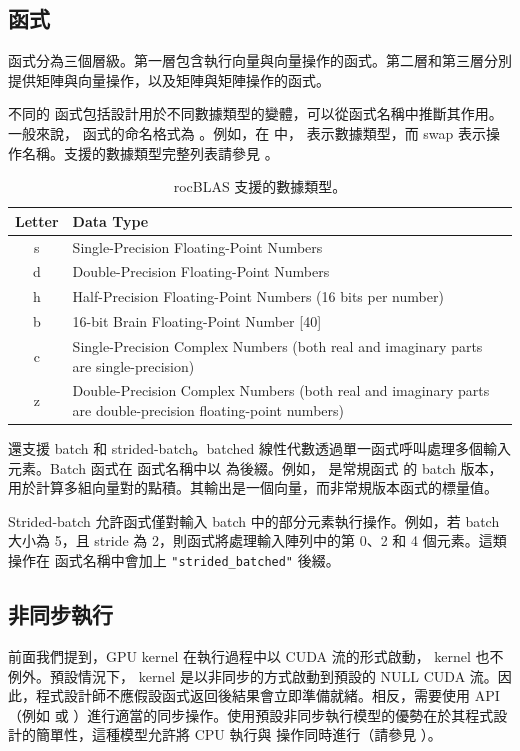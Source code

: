 \subsection{ 函式} \label{sec:rocBLAS_function}
 函式分為三個層級。第一層包含執行向量與向量操作的函式。第二層和第三層分別提供矩陣與向量操作，以及矩陣與矩陣操作的函式。

不同的  函式包括設計用於不同數據類型的變體，可以從函式名稱中推斷其作用。一般來說， 函式的命名格式為 。例如，在  中， 表示數據類型，而 swap 表示操作名稱。支援的數據類型完整列表請參見 。

\begin{table}[h!]
    \centering
    \caption{rocBLAS 支援的數據類型。}
    \label{tab:rocblas_data_types}
    \begin{tabular}{cl}
        \hline
        \textbf{Letter} & \textbf{Data Type} \\ \hline
        s & Single-Precision Floating-Point Numbers \\ 
        d & Double-Precision Floating-Point Numbers \\ 
        h & Half-Precision Floating-Point Numbers (16 bits per number) \\ 
        b & 16-bit Brain Floating-Point Number [40] \\ 
        c & Single-Precision Complex Numbers (both real and imaginary parts are single-precision) \\
        z & Double-Precision Complex Numbers (both real and imaginary parts are double-precision floating-point numbers) \\ \hline
    \end{tabular}
\end{table}

 還支援 batch 和 strided-batch。batched 線性代數透過單一函式呼叫處理多個輸入元素。Batch 函式在  函式名稱中以  為後綴。例如， 是常規函式  的 batch 版本，用於計算多組向量對的點積。其輸出是一個向量，而非常規版本函式的標量值。

Strided-batch 允許函式僅對輸入 batch 中的部分元素執行操作。例如，若 batch 大小為 5，且 stride 為 2，則函式將處理輸入陣列中的第 0、2 和 4 個元素。這類操作在  函式名稱中會加上 \texttt{"strided\_batched"} 後綴。

\subsection{非同步執行}
前面我們提到，GPU kernel 在執行過程中以 CUDA 流的形式啟動， kernel 也不例外。預設情況下， kernel 是以非同步的方式啟動到預設的 NULL CUDA 流。因此，程式設計師不應假設函式返回後結果會立即準備就緒。相反，需要使用  API（例如  或 ）進行適當的同步操作。使用預設非同步執行模型的優勢在於其程式設計的簡單性，這種模型允許將 CPU 執行與  操作同時進行（請參見 ）。


